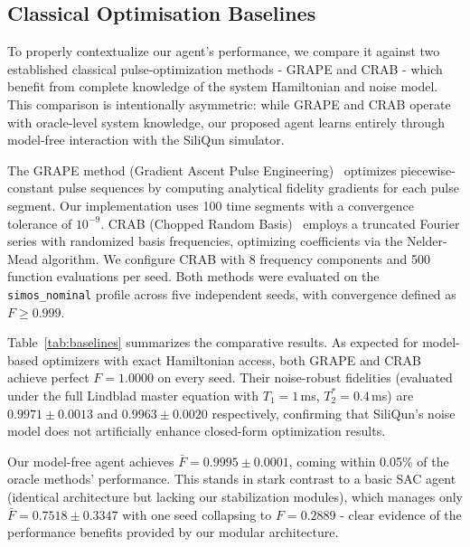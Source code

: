 \subsection{Classical Optimisation Baselines}
\label{subsec:baselines}

To properly contextualize our agent's performance, we compare it against two established classical pulse-optimization methods - GRAPE and CRAB - which benefit from complete knowledge of the system Hamiltonian and noise model. This comparison is intentionally asymmetric: while GRAPE and CRAB operate with oracle-level system knowledge, our proposed agent learns entirely through model-free interaction with the SiliQun simulator.

The GRAPE method (Gradient Ascent Pulse Engineering)~\cite{Khaneja2005} optimizes piecewise-constant pulse sequences by computing analytical fidelity gradients for each pulse segment. Our implementation uses 100 time segments with a convergence tolerance of $10^{-9}$. CRAB (Chopped Random Basis)~\cite{Caneva2011} employs a truncated Fourier series with randomized basis frequencies, optimizing coefficients via the Nelder-Mead algorithm. We configure CRAB with 8 frequency components and 500 function evaluations per seed. Both methods were evaluated on the \texttt{simos\_nominal} profile across five independent seeds, with convergence defined as $F \geq 0.999$.

Table~\ref{tab:baselines} summarizes the comparative results. As expected for model-based optimizers with exact Hamiltonian access, both GRAPE and CRAB achieve perfect $F = 1.0000$ on every seed. Their noise-robust fidelities (evaluated under the full Lindblad master equation with $T_1 = 1$\,ms, $T_2^* = 0.4$\,ms) are $0.9971 \pm 0.0013$ and $0.9963 \pm 0.0020$ respectively, confirming that SiliQun's noise model does not artificially enhance closed-form optimization results.

Our model-free agent achieves $\bar{F} = 0.9995 \pm 0.0001$, coming within 0.05\% of the oracle methods' performance. This stands in stark contrast to a basic SAC agent (identical architecture but lacking our stabilization modules), which manages only $\bar{F} = 0.7518 \pm 0.3347$ with one seed collapsing to $F = 0.2889$ - clear evidence of the performance benefits provided by our modular architecture.

